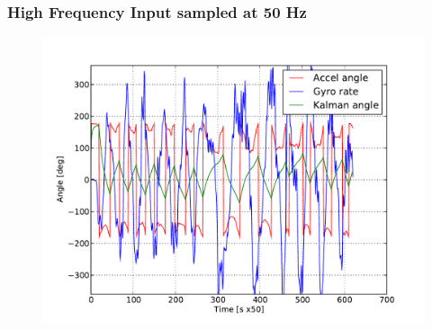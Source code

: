 \begin{frame}
\frametitle{High Frequency Input sampled at 50 Hz}
\begin{figure}
\centering
\includegraphics[width=\textwidth]{fig/kf.pdf}
\end{figure}
\end{frame}
